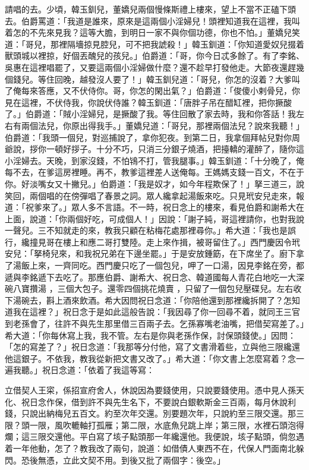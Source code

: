 請唱的去。少頃，韓玉釧兒，董嬌兒兩個慢條斯禮上樓來，望上不當不正磕下頭去。伯爵罵道：「我道是誰來，原來是這兩個小淫婦兒！頭裡知道我在這裡，我叫着怎的不先來見我？這等大膽，到明日一家不與你個功德，你也不怕。」董嬌兒笑道：「哥兒，那裡隔墻掠見腔兒，可不把我諕殺！」韓玉釧道：「你知道愛奴兒掇着獸頭城以裡掠，好個丟醜兒的孩兒。」伯爵道：「哥，你今日忒多餘了。有了李銘、吳惠在這裡唱罷了，又要這兩個小淫婦做什麼？還不趁早打發他走。大節夜還趕幾個錢兒。等住回晚，越發沒人要了！」韓玉釧兒道：「哥兒，你怎的沒着？大爹叫了俺每來答應，又不伏侍你。哥，你怎的閑出氣？」伯爵道：「俊傻小剌骨兒，你見在這裡，不伏侍我，你說伏侍誰？韓玉釧道：「唐胖子吊在醋缸裡，把你撅酸了。」伯爵道：「賊小淫婦兒，是撅酸了我。等住回散了家去時，我和你答話！我左右有兩個法兒，你原出得我手。」董嬌兒道：「哥兒，那裡兩個法兒？說來我聽！」伯爵道：「我頭一個兒，對巡捕說了，拿你犯夜。到第二日，我拿個拜帖兒對你周爺說，拶你一頓好拶子。十分不巧，只消三分銀子燒酒，把擡轎的灌醉了，隨你這小淫婦去。天晚，到家沒錢，不怕鴇不打，管我腿事。」韓玉釧道：「十分晚了，俺每不去，在爹這房裡睡。再不，教爹這裡差人送俺每。王媽媽支錢一百文，不在于你。好淡嘴女又十撇兒。」伯爵道：「我是奴才，如今年程欺保了！」拏三道三，說笑回，兩個唱的在傍彈唱了春景之詞。眾人纔拿起湯飯來吃。只見玳安兒走來，報道：「祝爹來了。」眾人多不言語。不一時，祝日念上的樓來，看見伯爵和謝希大在上面，說道：「你兩個好吃，可成個人！」因說：「謝子純，哥這裡請你，也對我說一聲兒。三不知就走的來，教我只顧在粘梅花處那裡尋你。」希大道：「我也是誤行，纔撞見哥在樓上和應二哥打雙陸。走上來作揖，被哥留住了。」西門慶因令玳安兒：「拏椅兒來，和我祝兄弟在下邊坐罷。」于是安放鍾筯，在下席坐了。廚下拿了湯飯上來，一齊同吃。西門慶只吃了一個包兒，呷了一口湯，因見李銘在旁，都遞與李銘遞下去吃了。那應伯爵、謝希大、祝日念、韓道國每人青花白地吃一大深碗八寶攢湯 ，三個大包子。還零四個挑花燒賣 ，只留了一個包兒壓碟兒。左右收下湯碗去，斟上酒來飲酒。希大因問祝日念道：「你陪他還到那裡纔拆開了？怎知道我在這裡？」祝日念于是如此這般告說：「我因尋了你一回尋不着，就同王三官到老孫會了，往許不與先生那里借三百兩子去。乞孫寡嘴老油嘴，把借契寫差了。」希大道：「你每休寫上我，我不管。左右是你與老孫作保，討保頭錢使。」因問：「怎的寫差了？」祝日念道：「我那等分付他，寫了文書滑着些，立與他三限纔還他這銀子。不依我，教我從新把文書又改了。」希大道：「你文書上怎麼寫着？念一遍我聽。」祝日念道：「依着了我這等寫：

立借契人王寀，係招宣府舍人，休說因為要錢使用，只說要錢使用。憑中見人孫天化、祝日念作保，借到許不與先生名下，不要說白銀軟斯金三百兩，每月休說利錢，只說出納梅兒五百文。約至次年交還。別要題次年，只說約至三限交還。那三限？頭一限，風吹轆軸打孤雁；第二限，水底魚兒跳上岸；第三限，水裡石頭泡得爛；這三限交還他。平白寫了垓子點頭那一年纔還他。我便說，垓子點頭，倘忽遇着一年他動，怎了？教我改了兩句，說道：如借債人東西不在，代保人門面南北躲閃。恐後無憑，立此文契不用。到後又批了兩個字：後空。」

